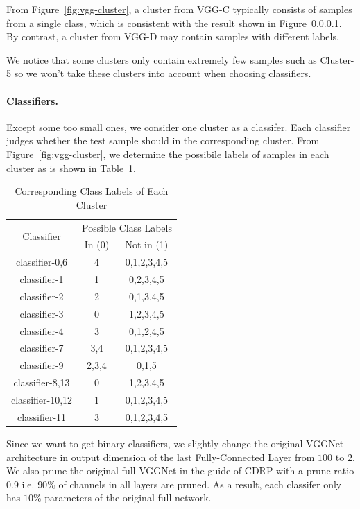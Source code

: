 \documentclass[sigplan,10pt,review]{acmart}\settopmatter{printfolios=true,printccs=false,printacmref=false}
\begin{document}
From Figure~\ref{fig:vgg-cluster}, a cluster from VGG-C typically consists of samples from a single class, which is consistent with the result shown in Figure~\ref{}. 
By contrast, a cluster from VGG-D may contain samples with different labels.

We notice that some clusters only contain extremely few samples such as Cluster-5 so we won't take these clusters into account when choosing classifiers.

\paragraph{Classifiers.} Except some too small ones, we consider one cluster as a classifer. Each classifier judges whether the test sample should in the corresponding cluster. 
From Figure~\ref{fig:vgg-cluster}, we determine the possibile labels of samples in each cluster as is shown in Table~\ref{tab:cluster_label}. 

\begin{table}[!htp]
	\begin{tabular}{|c|c|c|}
	\hline
	\multirow{2}{*}{Classifier} &\multicolumn{2}{|c|}{Possible Class Labels}\\
	\cline{2-3}
	& In (0) & Not in (1)\\
	\hline
	classifier-0,6 & 4 & 0,1,2,3,4,5\\
	classifier-1 & 1 & 0,2,3,4,5\\
	classifier-2 & 2 & 0,1,3,4,5\\
	classifier-3 & 0 & 1,2,3,4,5\\
	classifier-4 & 3 & 0,1,2,4,5\\
	classifier-7 & 3,4 & 0,1,2,3,4,5\\ 
	classifier-9 & 2,3,4 & 0,1,5\\ 
	classifier-8,13 & 0 & 1,2,3,4,5\\
	classifier-10,12 & 1 & 0,1,2,3,4,5\\
	classifier-11 & 3 & 0,1,2,3,4,5\\
	\hline

	\end{tabular}
	\caption{Corresponding Class Labels of Each Cluster}
	\label{tab:cluster_label}
\end{table}

Since we want to get binary-classifiers, we slightly change the original VGGNet architecture in output dimension of the last Fully-Connected Layer from $100$ to $2$. 
We also prune the original full VGGNet in the guide of CDRP with a prune ratio $0.9$ i.e. $90\%$ of channels in all layers are pruned. 
As a result, each classifer only has $10\%$ parameters of the original full network.
\end{document}
